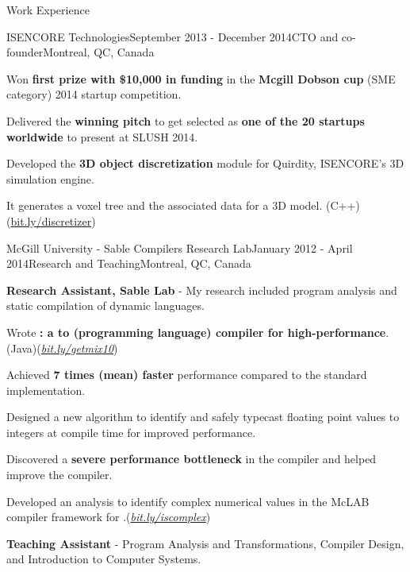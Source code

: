 \documentclass{resume} %
\begin{document}
\begin{rSection}{Work Experience}
\begin{rSubsection}{ISENCORE Technologies}{September 2013 - December 2014}{CTO
        and co-founder}{Montreal, QC, Canada}
\item Won \textbf{first prize with \$10,000 in funding} in the \textbf{Mcgill
        Dobson cup} (SME category) 2014 startup competition. 
\item Delivered the \textbf{winning pitch} to get selected as \textbf{one of
        the 20 startups worldwide} to present at SLUSH 2014.
\item Developed the \textbf{3D object discretization} module for Quirdity, ISENCORE's 3D simulation engine. 
\begin{lsubSubsection}
\item It generates a voxel tree and the associated data for a 3D model.
        (C++)(\href{http://bit.ly/discretizer}{bit.ly/discretizer})
\end{lsubSubsection}
\end{rSubsection}

\begin{rSubsection}{McGill University - Sable Compilers Research Lab}{January
        2012 - April 2014}{Research and Teaching}{Montreal, QC, Canada} 
\item \textbf{Research Assistant, Sable Lab} - My research included program
        analysis and static compilation of dynamic languages.

\begin{lsubSubsection}
\item Wrote \textbf{\mixtenx: a \matlab to \xten (programming language) compiler for
        high-performance}. (Java)(\href{http://bit.ly/getmix10}{\em{bit.ly/getmix10}})  
\item Achieved \textbf{7 times (mean) faster} performance compared to the
        standard \matlab implementation.
\item Designed a new algorithm to identify and safely typecast
        floating point values to integers at compile time for improved
        performance.
\item Discovered a \textbf{severe performance bottleneck} in the \xten compiler
        and helped improve the \xten compiler.  
\item Developed an analysis to identify complex numerical values in the McLAB compiler framework for \matlab.(\href{http://bit.ly/iscomplex}{\em{bit.ly/iscomplex}}) 
\end{lsubSubsection}
\item \textbf{Teaching Assistant} - Program Analysis and Transformations,
	Compiler Design, and Introduction to Computer Systems.
\end{rSubsection}


\end{rSection}
\end{document}
